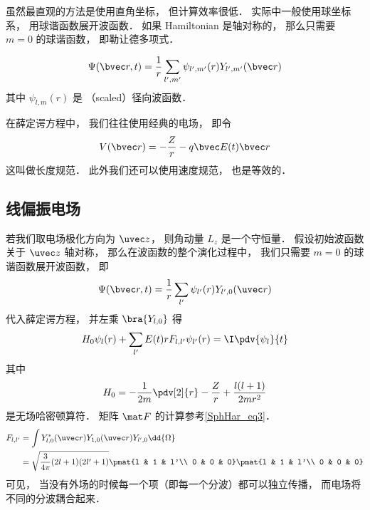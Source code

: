 

虽然最直观的方法是使用直角坐标， 但计算效率很低． 实际中一般使用球坐标系， 用球谐函数展开波函数． 如果 Hamiltonian 是轴对称的， 那么只需要 $m = 0$ 的球谐函数， 即勒让德多项式．

\begin{equation}
\Psi(\bvec r, t) = \frac{1}{r}\sum_{l',m'} \psi_{l',m'}(r) Y_{l',m'}(\bvec r)
\end{equation}
其中 $\psi_{l,m}(r)$ 是 （scaled）径向波函数．

在薛定谔方程中， 我们往往使用经典的电场， 即令
\begin{equation}
V(\bvec r) = -\frac{Z}{r} - q\bvec E(t) \bvec r
\end{equation}
这叫做长度规范．%
此外我们还可以使用速度规范， 也是等效的．%

\subsection{线偏振电场}
若我们取电场极化方向为 $\uvec z$， 则角动量 $L_z$ 是一个守恒量． 假设初始波函数关于 $\uvec z$ 轴对称， 那么在波函数的整个演化过程中， 我们只需要 $m=0$ 的球谐函数展开波函数， 即
\begin{equation}
\Psi(\bvec r, t) = \frac{1}{r}\sum_{l'} \psi_{l'}(r) Y_{l', 0}(\uvec r)
\end{equation}
代入薛定谔方程， 并左乘 $\bra{Y_{l,0}}$ 得
\begin{equation}\label{HyTDSE_eq4}
H_0 \psi_{l}(r) + \sum_{l'} E(t)rF_{l, l'} \psi_{l'}(r) = \I \pdv{\psi_{l}}{t}
\end{equation}
其中
\begin{equation}
H_0 = -\frac{1}{2m} \pdv[2]{r} -\frac{Z}{r} + \frac{l(l+1)}{2mr^2}
\end{equation}
是无场哈密顿算符． 矩阵 $\mat F$ 的计算参考\autoref{SphHar_eq3}．
\begin{equation}
\begin{aligned}
F_{l,l'} &= \int Y_{l,0}^*(\uvec r) Y_{1,0}(\uvec r) Y_{l',0} \dd{\Omega}\\
&= \sqrt{\frac{3}{4\pi} (2l+1)(2l'+1)} \pmat{l & 1 & l'\\ 0 & 0 & 0}\pmat{l & 1 & l'\\ 0 & 0 & 0}
\end{aligned}
\end{equation}
可见， 当没有外场的时候每一个项（即每一个分波）都可以独立传播， 而电场将不同的分波耦合起来．

